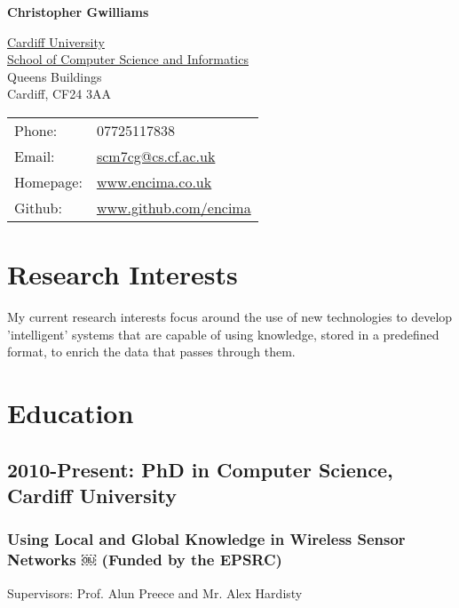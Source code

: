 \documentclass[11pt,fullpage]{article}
\def\name{Christopher Gwilliams}
\begin{document}


\centerline{\Large \bf \name}

\vspace{0.25in}

\begin{minipage}{0.50\linewidth}
  \href{http://cf.ac.uk/}{Cardiff University} \\
  \href{http://cs.cf.ac.uk}{School of Computer Science and Informatics} \\
  Queens Buildings \\
Cardiff, CF24 3AA
\end{minipage}
\begin{minipage}{0.50\linewidth}
  \begin{tabular}{ll}
    Phone: & 07725117838 \\
    Email: & \href{mailto:scm7cg@cs.cf.ac.uk}{scm7cg@cs.cf.ac.uk} \\
    Homepage: & \href{http://www.encima.co.uk/}{www.encima.co.uk} \\
    Github: & \href{http:/github.com/encima/}{www.github.com/encima} \\
  \end{tabular}
\end{minipage}

\section*{Research Interests}
My current research interests focus around the use of new technologies to develop 'intelligent' systems that are capable of using knowledge, stored in a predefined format, to enrich the data that passes through them.

\section*{Education}
\subsection*{\textbf{2010-Present: PhD} in Computer Science, Cardiff University}
\subsubsection*{Using Local and Global Knowledge in Wireless Sensor Networks
￼ (Funded by the EPSRC)}
Supervisors: Prof. Alun Preece and Mr. Alex Hardisty
\end{document}
